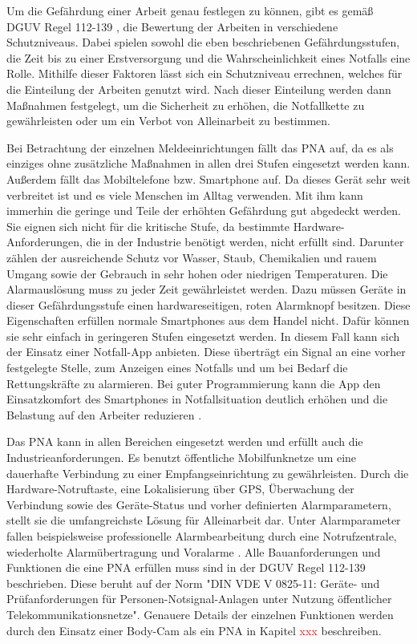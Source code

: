 \documentclass[thesis.tex]{subfiles}
\begin{document}
Um die Gefährdung einer Arbeit genau festlegen zu können, gibt es gemäß DGUV Regel 112-139 \cite[]{Regel_112-139}, die Bewertung der Arbeiten in verschiedene Schutzniveaus.
Dabei spielen sowohl die eben beschriebenen Gefährdungsstufen, die Zeit bis zu einer Erstversorgung und die Wahrscheinlichkeit eines Notfalls eine Rolle.
Mithilfe dieser Faktoren lässt sich ein Schutzniveau errechnen, welches für die Einteilung der Arbeiten genutzt wird.
Nach dieser Einteilung werden dann Maßnahmen festgelegt, um die Sicherheit zu erhöhen, die Notfallkette zu gewährleisten oder um ein Verbot von Alleinarbeit zu bestimmen.

Bei Betrachtung der einzelnen Meldeeinrichtungen fällt das PNA auf, da es als einziges ohne zusätzliche Maßnahmen in allen drei Stufen eingesetzt werden kann.
Außerdem fällt das Mobiltelefone bzw. Smartphone auf.
Da dieses Gerät sehr weit verbreitet ist und es viele Menschen im Alltag verwenden.
Mit ihm kann immerhin die geringe und Teile der erhöhten Gefährdung gut abgedeckt werden.
Sie eignen sich nicht für die kritische Stufe, da bestimmte Hardware-Anforderungen, die in der Industrie benötigt werden, nicht erfüllt sind.
Darunter zählen der ausreichende Schutz vor Wasser, Staub, Chemikalien und rauem Umgang sowie der Gebrauch in sehr hohen oder niedrigen Temperaturen.
Die Alarmauslösung muss zu jeder Zeit gewährleistet werden.
Dazu müssen Geräte in dieser Gefährdungsstufe einen hardwareseitigen, roten Alarmknopf besitzen.
Diese Eigenschaften erfüllen normale Smartphones aus dem Handel nicht.
Dafür können sie sehr einfach in geringeren Stufen eingesetzt werden.
In diesem Fall kann sich der Einsatz einer Notfall-App anbieten.
Diese überträgt ein Signal an eine vorher festgelegte Stelle, zum Anzeigen eines Notfalls und um bei Bedarf die Rettungskräfte zu alarmieren.
Bei guter Programmierung kann die App den Einsatzkomfort des Smartphones in Notfallsituation deutlich erhöhen und die Belastung auf den Arbeiter reduzieren \cite[vgl. S.2-5]{FAQ-PNAuAPP}.

Das PNA kann in allen Bereichen eingesetzt werden und erfüllt auch die Industrieanforderungen.
Es benutzt öffentliche Mobilfunknetze um eine dauerhafte Verbindung zu einer Empfangseinrichtung zu gewährleisten.
Durch die Hardware-Notruftaste, eine Lokalisierung über GPS, Überwachung der Verbindung sowie des Geräte-Status und vorher definierten Alarmparametern, stellt sie die umfangreichste Lösung für Alleinarbeit dar.
Unter Alarmparameter fallen beispielsweise professionelle Alarmbearbeitung durch eine Notrufzentrale, wiederholte Alarmübertragung und Voralarme \cite[vgl. S.2-5]{FAQ-PNAuAPP}.
Alle Bauanforderungen und Funktionen die eine PNA erfüllen muss sind in der DGUV Regel 112-139 \cite[]{Regel_112-139} beschrieben.
Diese beruht auf der Norm "DIN VDE V 0825-11: Geräte- und Prüfanforderungen für Personen-Notsignal-Anlagen unter Nutzung öffentlicher Telekommunikationsnetze". Genauere Details der einzelnen Funktionen werden durch den Einsatz einer Body-Cam als ein PNA in Kapitel \textcolor{red}{xxx} beschreiben.
\end{document}
